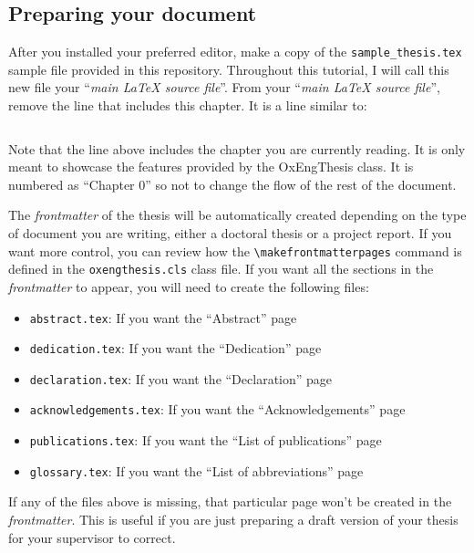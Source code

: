 \subsection{Preparing your document}

After you installed your preferred \latex editor, make a copy of the \verb|sample_thesis.tex| sample file provided in this repository. Throughout this tutorial, I will call this new file your ``\textit{main LaTeX source file}''. From your ``\textit{main LaTeX source file}'', remove the line that includes this chapter. It is a line similar to:


\begin{lstlisting}[style=custom-latex]

\end{lstlisting}


Note that the line above includes the chapter you are currently reading. It is only meant to showcase the features provided by the OxEngThesis class. It is numbered as ``Chapter 0'' so not to change the flow of the rest of the document.

The \textit{frontmatter} of the thesis will be automatically created depending on the type of document you are writing, either a doctoral thesis or a project report. If you want more control, you can review how the \verb|\makefrontmatterpages| command is defined in the \verb|oxengthesis.cls| class file. If you want all the sections in the \textit{frontmatter} to appear, you will need to create the following files:


\begin{itemize}
    \item \verb|abstract.tex|: If you want the ``Abstract'' page
    \item \verb|dedication.tex|: If you want the ``Dedication'' page
    \item \verb|declaration.tex|: If you want the ``Declaration'' page
    \item \verb|acknowledgements.tex|: If you want the ``Acknowledgements'' page
    \item \verb|publications.tex|: If you want the ``List of publications'' page
    \item \verb|glossary.tex|: If you want the ``List of abbreviations'' page
\end{itemize}


If any of the files above is missing, that particular page won't be created in the \textit{frontmatter}. This is useful if you are just preparing a draft version of your thesis for your supervisor to correct. 

